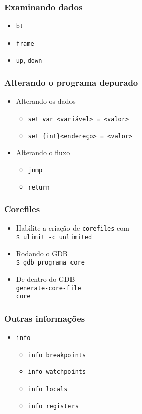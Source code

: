 \documentclass[xcolor=pdftex,dvipsnames,table,t]{beamer}
\begin{document}
\begin{frame}
	\frametitle{Examinando dados}
	  \begin{itemize}
	    \item \texttt{bt}
	    \item \texttt{frame}
	    \item \texttt{up}, \texttt{down}
	  \end{itemize}
\end{frame}

\begin{frame}
	\frametitle{Alterando o programa depurado}
	  \begin{itemize}
	    \item Alterando os dados
	      \begin{itemize}
		\item \texttt{set var <variável> = <valor>}
		\item \texttt{set \{int\}<endereço> = <valor>}
	      \end{itemize}
	    \item Alterando o fluxo
	      \begin{itemize}
		\item \texttt{jump}
		\item \texttt{return}
	      \end{itemize}
	  \end{itemize}
\end{frame}

\begin{frame}
	\frametitle{Corefiles} %
	  \begin{itemize}
	  \item Habilite a criação de \texttt{corefiles} com \\
		\texttt{\$ ulimit -c unlimited}
	  \item Rodando o GDB \\
		\texttt{\$ gdb programa core}
	  \item De dentro do GDB \\
		\texttt{generate-core-file} \\
		\texttt{core}
	  \end{itemize}
\end{frame}

\begin{frame}
	\frametitle{Outras informações}
	  \begin{itemize}
	    \item \texttt{info}
	    \begin{itemize}
	      \item \texttt{info breakpoints}
	      \item \texttt{info watchpoints}
	      \item \texttt{info locals}
	      \item \texttt{info registers}
	    \end{itemize}
	  \end{itemize}
\end{frame}
\end{document}
